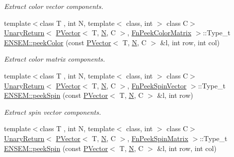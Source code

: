 \begin{DoxyCompactItemize}
\begin{DoxyCompactList}\small\item\em Extract color vector components. \end{DoxyCompactList}\item 
{\footnotesize template$<$class T , int N, template$<$ class, int $>$ class C$>$ }\\\mbox{\hyperlink{structENSEM_1_1UnaryReturn}{Unary\+Return}}$<$ \mbox{\hyperlink{classENSEM_1_1PVector}{P\+Vector}}$<$ T, \mbox{\hyperlink{operator__name__util_8cc_a7722c8ecbb62d99aee7ce68b1752f337}{N}}, C $>$, \mbox{\hyperlink{structENSEM_1_1FnPeekColorMatrix}{Fn\+Peek\+Color\+Matrix}} $>$\+::Type\+\_\+t \mbox{\hyperlink{group__primvector_gaa5bcf955bf475e0717ffc91e91c154b9}{E\+N\+S\+E\+M\+::peek\+Color}} (const \mbox{\hyperlink{classENSEM_1_1PVector}{P\+Vector}}$<$ T, \mbox{\hyperlink{operator__name__util_8cc_a7722c8ecbb62d99aee7ce68b1752f337}{N}}, C $>$ \&l, int row, int col)
\begin{DoxyCompactList}\small\item\em Extract color matrix components. \end{DoxyCompactList}\item 
{\footnotesize template$<$class T , int N, template$<$ class, int $>$ class C$>$ }\\\mbox{\hyperlink{structENSEM_1_1UnaryReturn}{Unary\+Return}}$<$ \mbox{\hyperlink{classENSEM_1_1PVector}{P\+Vector}}$<$ T, \mbox{\hyperlink{operator__name__util_8cc_a7722c8ecbb62d99aee7ce68b1752f337}{N}}, C $>$, \mbox{\hyperlink{structENSEM_1_1FnPeekSpinVector}{Fn\+Peek\+Spin\+Vector}} $>$\+::Type\+\_\+t \mbox{\hyperlink{group__primvector_ga4da125100d39a8e268564ed66d48bae5}{E\+N\+S\+E\+M\+::peek\+Spin}} (const \mbox{\hyperlink{classENSEM_1_1PVector}{P\+Vector}}$<$ T, \mbox{\hyperlink{operator__name__util_8cc_a7722c8ecbb62d99aee7ce68b1752f337}{N}}, C $>$ \&l, int row)
\begin{DoxyCompactList}\small\item\em Extract spin vector components. \end{DoxyCompactList}\item 
{\footnotesize template$<$class T , int N, template$<$ class, int $>$ class C$>$ }\\\mbox{\hyperlink{structENSEM_1_1UnaryReturn}{Unary\+Return}}$<$ \mbox{\hyperlink{classENSEM_1_1PVector}{P\+Vector}}$<$ T, \mbox{\hyperlink{operator__name__util_8cc_a7722c8ecbb62d99aee7ce68b1752f337}{N}}, C $>$, \mbox{\hyperlink{structENSEM_1_1FnPeekSpinMatrix}{Fn\+Peek\+Spin\+Matrix}} $>$\+::Type\+\_\+t \mbox{\hyperlink{group__primvector_ga5461f8956839af7e7079b717601376a7}{E\+N\+S\+E\+M\+::peek\+Spin}} (const \mbox{\hyperlink{classENSEM_1_1PVector}{P\+Vector}}$<$ T, \mbox{\hyperlink{operator__name__util_8cc_a7722c8ecbb62d99aee7ce68b1752f337}{N}}, C $>$ \&l, int row, int col)

\end{DoxyCompactItemize}
